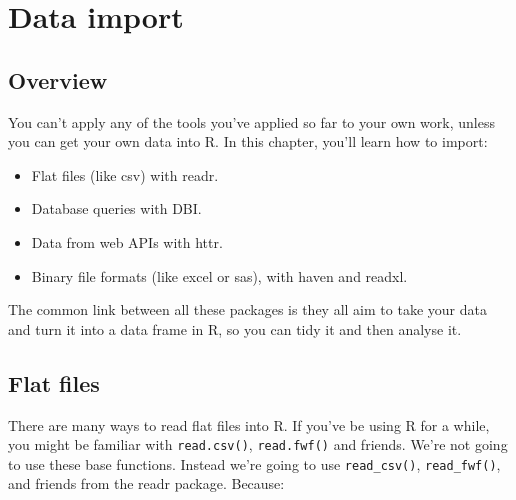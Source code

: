 \chapter{Data import}

\section{Overview}

You can't apply any of the tools you've applied so far to your own work,
unless you can get your own data into R. In this chapter, you'll learn
how to import:

\begin{itemize}
\itemsep1pt\parskip0pt
\item
  Flat files (like csv) with readr.
\item
  Database queries with DBI.
\item
  Data from web APIs with httr.
\item
  Binary file formats (like excel or sas), with haven and readxl.
\end{itemize}

The common link between all these packages is they all aim to take your
data and turn it into a data frame in R, so you can tidy it and then
analyse it.

\section{Flat files}

There are many ways to read flat files into R. If you've be using R for
a while, you might be familiar with \texttt{read.csv()},
\texttt{read.fwf()} and friends. We're not going to use these base
functions. Instead we're going to use \texttt{read\_csv()},
\texttt{read\_fwf()}, and friends from the readr package. Because:

